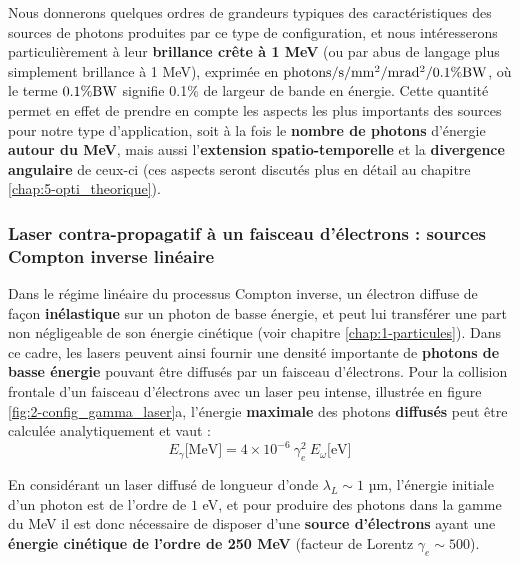 \begin{refsection}
Nous donnerons quelques ordres de grandeurs typiques des caractéristiques des sources de photons produites par ce type de configuration, et nous intéresserons particulièrement à leur \textbf{brillance crête à 1 MeV} (ou par abus de langage plus simplement brillance à 1 MeV), exprimée en $\rm photons/s/mm^2/mrad^2/0.1\%BW$, où le terme $0.1\rm \%BW$ signifie 0.1\% de largeur de bande en énergie. Cette quantité permet en effet de prendre en compte les aspects les plus importants des sources pour notre type d'application, soit à la fois le \textbf{nombre de photons} d'énergie \textbf{autour du MeV}, mais aussi l'\textbf{extension spatio-temporelle} et la \textbf{divergence angulaire} de ceux-ci (ces aspects seront discutés plus en détail au chapitre \ref{chap:5-opti_theorique}).

\subsubsection{Laser contra-propagatif à un faisceau d'électrons : sources Compton inverse linéaire}

Dans le régime linéaire du processus Compton inverse, un électron diffuse de façon \textbf{inélastique} sur un photon de basse énergie, et peut lui transférer une part non négligeable de son énergie cinétique (voir chapitre \ref{chap:1-particules}). Dans ce cadre, les lasers peuvent ainsi fournir une densité importante de \textbf{photons de basse énergie} pouvant être diffusés par un faisceau d'électrons. Pour la collision frontale d'un faisceau d'électrons avec un laser peu intense, illustrée en figure \ref{fig:2-config_gamma_laser}a, l'énergie \textbf{maximale} des photons \textbf{diffusés} peut être calculée analytiquement et vaut \parencite{corde_2013a} :
\begin{equation}
    E_\gamma \si{[\MeV]} = 4 \times 10^{-6} ~ \gamma_e^2 ~ E_\omega \si{[\eV]}
\end{equation}

En considérant un laser diffusé de longueur d'onde $\lambda_L \sim 1$ µm, l'énergie initiale d'un photon est de l'ordre de $1$ eV, et pour produire des photons dans la gamme du MeV il est donc nécessaire de disposer d'une \textbf{source d'électrons} ayant une \textbf{énergie cinétique de l'ordre de 250 MeV} (facteur de Lorentz $\gamma_e \sim 500$).


\end{refsection}
